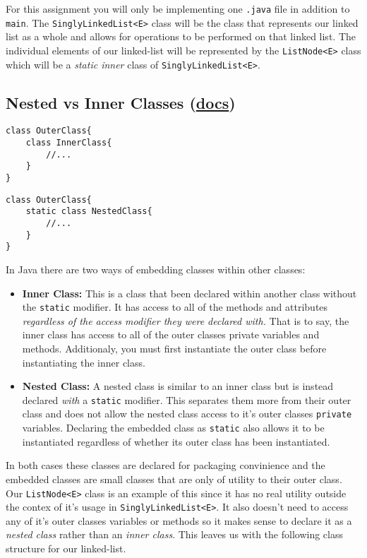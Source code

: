 \documentclass[a4paper]{article}
\begin{document}
For this assignment you will only be implementing one \lstinline|.java| file in
addition to \lstinline|main|. The \lstinline|SinglyLinkedList<E>| class will be
the class that represents our linked list as a whole and allows for operations
to be performed on that linked list. The individual elements of our linked-list
will be represented by the \lstinline|ListNode<E>| class which will be a
\textit{static inner} class of \lstinline|SinglyLinkedList<E>|.

\subsection{Nested vs Inner Classes (\href{https://docs.oracle.com/javase/tutorial/java/javaOO/nested.html}{docs})}
\begin{minipage}{0.45\textwidth}
\begin{lstlisting}[frame=trBL]
class OuterClass{
    class InnerClass{
        //...
    }
}
\end{lstlisting}
\end{minipage}
\hfill
\begin{minipage}{0.45\textwidth}
\begin{lstlisting}[frame=trBL]
class OuterClass{
    static class NestedClass{
        //...
    }
}
\end{lstlisting}
\end{minipage}

In Java there are two ways of embedding classes within other classes:
\begin{itemize}
    \item \textbf{Inner Class:} This is a class that been declared within another class without the \lstinline|static| modifier. It has access to all of the methods and attributes \textit{regardless of the access modifier they were declared with.} That is to say, the inner class has access to all of the outer classes private variables and methods. Additionaly, you must first instantiate the outer class before instantiating the inner class.
    \item \textbf{Nested Class:} A nested class is similar to an inner class but is instead declared \textit{with} a \lstinline|static| modifier. This separates them more from their outer class and does not allow the nested class access to it's outer classes \lstinline|private| variables. Declaring the embedded class as \lstinline|static| also allows it to be instantiated regardless of whether its outer class has been instantiated. 
\end{itemize}
In both cases these classes are declared for packaging convinience and the
embedded classes are small classes that are only of utility to their outer
class. Our \lstinline|ListNode<E>| class is an example of this since it has no
real utility outside the contex of it's usage in \lstinline|SinglyLinkedList<E>|. It 
also doesn't need to access any of it's outer classes variables or methods 
so it makes sense to declare it as a \textit{nested class} rather than an
\textit{inner class}. This leaves us with the following class structure
for our linked-list.\\
\end{document}
